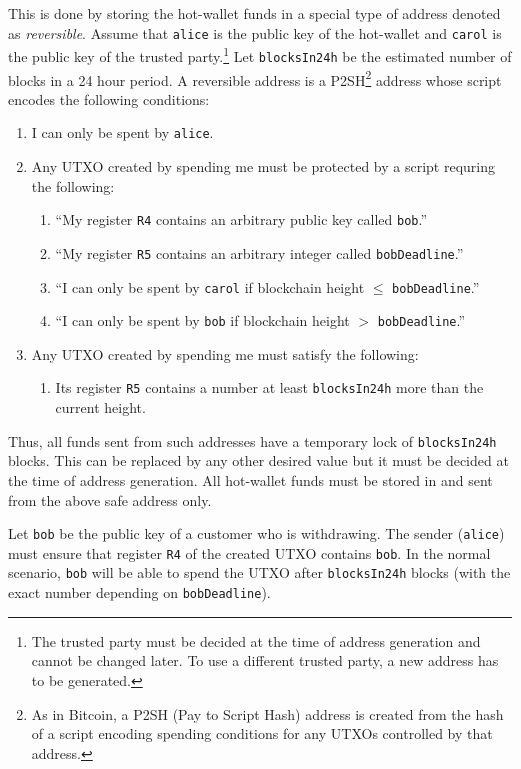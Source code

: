 \documentclass[11pt]{article}
\begin{document}
This is done by storing the hot-wallet funds in a special type of address denoted as {\em reversible}. Assume that \texttt{alice} is the public key of the hot-wallet and \texttt{carol} is the public key of the trusted party.\footnote{The trusted party must be decided at the time of address generation and cannot be changed later. To use a different trusted party, a new address has to be generated.} Let \texttt{blocksIn24h} be the estimated number of blocks in a 24 hour period. A reversible address is a P2SH\footnote{As in Bitcoin, a P2SH (Pay to Script Hash) address is created from the hash of a script encoding spending conditions for any UTXOs controlled by that address.} address whose script encodes the following conditions:   
\begin{enumerate}
	\item I can only be spent by \texttt{alice}.
	\item Any UTXO created by spending me must be protected by a script requring the following: 	
	\begin{enumerate}
		\item ``My register \texttt{R4} contains an arbitrary public key called \texttt{bob}.'' 
		\item ``My register \texttt{R5} contains an arbitrary integer called \texttt{bobDeadline}.'' 
		\item ``I can only be spent by \texttt{carol} if blockchain height $\leq$ \texttt{bobDeadline}.''
		\item ``I can only be spent by \texttt{bob} if blockchain height $>$ \texttt{bobDeadline}.''	
	\end{enumerate}  
	\item Any UTXO created by spending me must satisfy the following: 	
	\begin{enumerate}
		\item Its register \texttt{R5} contains a number at least \texttt{blocksIn24h} more than the current height. 
	\end{enumerate}  
\end{enumerate}

Thus, all funds sent from such addresses have a temporary lock of \texttt{blocksIn24h} blocks. This can be replaced by any other desired value but it must be decided at the time of address generation. All hot-wallet funds must be stored in and sent from the above safe address only. 

Let \texttt{bob} be the public key of a customer who is withdrawing. The sender (\texttt{alice}) must ensure that register \texttt{R4} of the created UTXO contains \texttt{bob}. In the normal scenario, \texttt{bob} will be able to spend the UTXO after \texttt{blocksIn24h} blocks (with the exact number depending on \texttt{bobDeadline}). 
\end{document}
